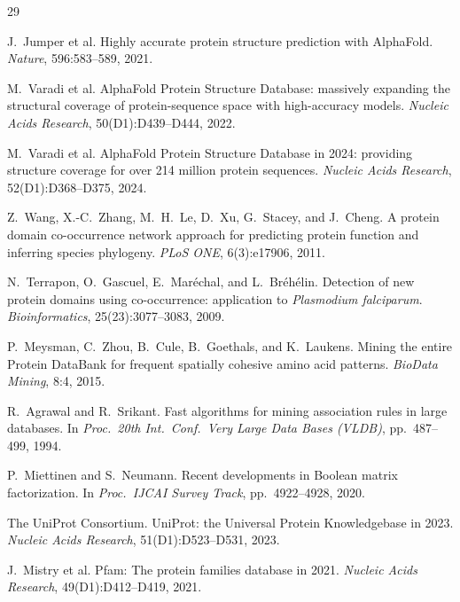 \documentclass[10pt,a4paper,twocolumn]{article}
\begin{document}
\begin{thebibliography}{29}

J.~Jumper et al.
\newblock Highly accurate protein structure prediction with AlphaFold.
\newblock \emph{Nature}, 596:583--589, 2021.

M.~Varadi et al.
\newblock AlphaFold Protein Structure Database: massively expanding the structural coverage of protein-sequence space with high-accuracy models.
\newblock \emph{Nucleic Acids Research}, 50(D1):D439--D444, 2022.

M.~Varadi et al.
\newblock AlphaFold Protein Structure Database in 2024: providing structure coverage for over 214 million protein sequences.
\newblock \emph{Nucleic Acids Research}, 52(D1):D368--D375, 2024.

Z.~Wang, X.-C.~Zhang, M.~H.~Le, D.~Xu, G.~Stacey, and J.~Cheng.
\newblock A protein domain co-occurrence network approach for predicting protein function and inferring species phylogeny.
\newblock \emph{PLoS ONE}, 6(3):e17906, 2011.

N.~Terrapon, O.~Gascuel, E.~Mar\'echal, and L.~Br\'eh\'elin.
\newblock Detection of new protein domains using co-occurrence: application to \emph{Plasmodium falciparum}.
\newblock \emph{Bioinformatics}, 25(23):3077--3083, 2009.

P.~Meysman, C.~Zhou, B.~Cule, B.~Goethals, and K.~Laukens.
\newblock Mining the entire Protein DataBank for frequent spatially cohesive amino acid patterns.
\newblock \emph{BioData Mining}, 8:4, 2015.

R.~Agrawal and R.~Srikant.
\newblock Fast algorithms for mining association rules in large databases.
\newblock In \emph{Proc.\ 20th Int.\ Conf.\ Very Large Data Bases (VLDB)}, pp.\ 487--499, 1994.

P.~Miettinen and S.~Neumann.
\newblock Recent developments in Boolean matrix factorization.
\newblock In \emph{Proc.\ IJCAI Survey Track}, pp.\ 4922--4928, 2020.

The UniProt Consortium.
\newblock UniProt: the Universal Protein Knowledgebase in 2023.
\newblock \emph{Nucleic Acids Research}, 51(D1):D523--D531, 2023.

J.~Mistry et al.
\newblock Pfam: The protein families database in 2021.
\newblock \emph{Nucleic Acids Research}, 49(D1):D412--D419, 2021.


\end{thebibliography}
\end{document}
